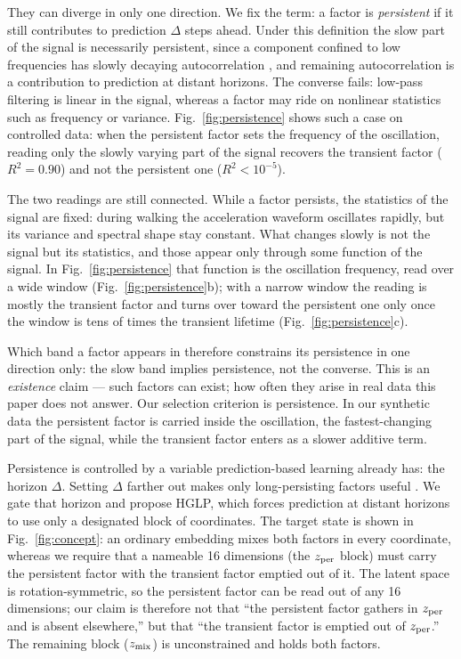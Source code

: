 They can diverge in only one direction. We fix the term: a factor is \emph{persistent} if it still contributes to prediction $\Delta$ steps ahead. Under this definition the slow part of the signal is necessarily persistent, since a component confined to low frequencies has slowly decaying autocorrelation \cite{khinchin1934}, and remaining autocorrelation is a contribution to prediction at distant horizons. The converse fails: low-pass filtering is linear in the signal, whereas a factor may ride on nonlinear statistics such as frequency or variance. Fig.~\ref{fig:persistence} shows such a case on controlled data: when the persistent factor sets the frequency of the oscillation, reading only the slowly varying part of the signal recovers the transient factor ($R^2 = 0.90$) and not the persistent one ($R^2 < 10^{-5}$).

The two readings are still connected. While a factor persists, the statistics of the signal are fixed: during walking the acceleration waveform oscillates rapidly, but its variance and spectral shape stay constant. What changes slowly is not the signal but its statistics, and those appear only through some function of the signal. In Fig.~\ref{fig:persistence} that function is the oscillation frequency, read over a wide window (Fig.~\ref{fig:persistence}b); with a narrow window the reading is mostly the transient factor and turns over toward the persistent one only once the window is tens of times the transient lifetime (Fig.~\ref{fig:persistence}c).

Which band a factor appears in therefore constrains its persistence in one direction only: the slow band implies persistence, not the converse. This is an \emph{existence} claim --- such factors can exist; how often they arise in real data this paper does not answer. Our selection criterion is persistence. In our synthetic data the persistent factor is carried inside the oscillation, the fastest-changing part of the signal, while the transient factor enters as a slower additive term.

Persistence is controlled by a variable prediction-based learning already has: the horizon $\Delta$. Setting $\Delta$ farther out makes only long-persisting factors useful \cite{bialek2001, creutzig2008}. We gate that horizon and propose HGLP, which forces prediction at distant horizons to use only a designated block of coordinates. The target state is shown in Fig.~\ref{fig:concept}: an ordinary embedding mixes both factors in every coordinate, whereas we require that a nameable 16 dimensions (the $z_{\mathrm{per}}$ block) must carry the persistent factor with the transient factor emptied out of it. The latent space is rotation-symmetric, so the persistent factor can be read out of any 16 dimensions; our claim is therefore not that ``the persistent factor gathers in $z_{\mathrm{per}}$ and is absent elsewhere,'' but that ``the transient factor is emptied out of $z_{\mathrm{per}}$.'' The remaining block ($z_{\mathrm{mix}}$) is unconstrained and holds both factors.

